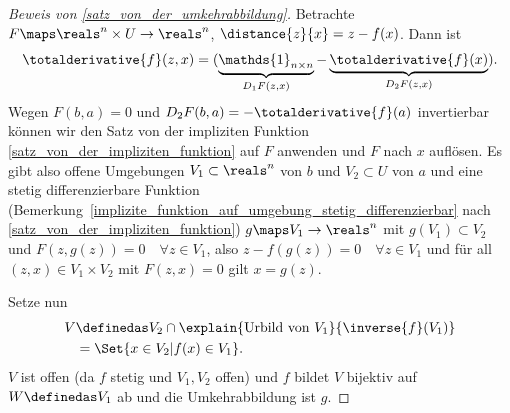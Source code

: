 \begin{proof}[Beweis von \ref{satz_von_der_umkehrabbildung}]
  Betrachte \( F\maps \reals^n\times U\to \reals^n \), \( \distance{z}{x}=z-f(x) \). Dann ist 
  \begin{equation*}
    \totalderivative{f}(z,x)=(\underbrace{\mathds{1}_{n\times n}}_{D_1 F(z,x)}-\underbrace{\totalderivative{f}(x)}_{D_2 F(z,x)}).
  \end{equation*} 
  Wegen \( F(b,a)=0 \) und \( D_2 F(b,a)=-\totalderivative{f}(a) \) invertierbar können wir den Satz von der impliziten Funktion \ref{satz_von_der_impliziten_funktion} auf \( F \) anwenden und \( F \) nach \( x \) auflösen. Es gibt also offene Umgebungen \( V_1\subset \reals^n \) von \( b \) und \( V_2\subset U \) von \( a \) und eine stetig differenzierbare Funktion (\vgl Bemerkung~\ref{implizite_funktion_auf_umgebung_stetig_differenzierbar} nach    \ref{satz_von_der_impliziten_funktion}) \( g\maps V_1\to \reals^n \) mit \( g(V_1)\subset V_2 \) und \( F(z,g(z))=0\quad \forall z\in V_1 \), also \( z-f(g(z))=0 \quad \forall z\in V_1 \) und für all \( (z,x)\in V_1\times V_2 \) mit \( F(z,x)=0 \) gilt \( x=g(z) \).

  Setze nun
  \begin{gather*}
    V \begin{aligned}[t]
      &\definedas V_2\cap \explain{\text{Urbild von \( V_1 \)}}{\inverse{f}(V_1)}\\
      &=\Set{x\in V_2|f(x)\in V_1}.
    \end{aligned}
  \end{gather*}
  \( V \) ist offen (da \( f \) stetig und \( V_1,V_2 \) offen) und \( f \) bildet \( V \) bijektiv auf \( W\definedas V_1 \) ab und die Umkehrabbildung ist \( g \).
\end{proof}

